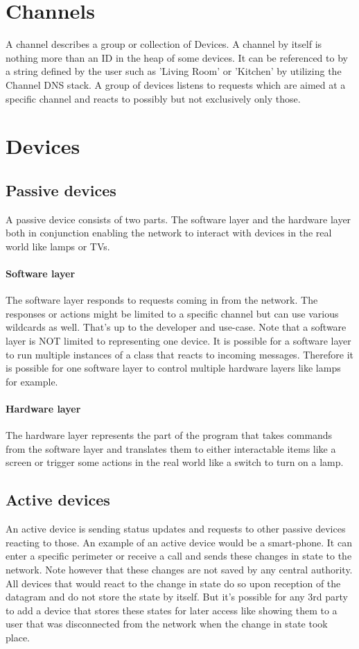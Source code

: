 \documentclass[a4paper]{article}
\begin{document}
	\section{Channels}
	    A channel describes a group or collection of Devices. A channel by itself is nothing more than an ID in the
	    heap of some devices. It can be referenced to by a string defined by the user such as 'Living Room' or 'Kitchen'
	    by utilizing the Channel DNS stack. A group of devices listens to requests which are aimed at a specific channel
	    and reacts to possibly but not exclusively only those.
	\section{Devices}
	    \subsection{Passive devices}
            A passive device consists of two parts. The software layer and the hardware layer both in conjunction
            enabling the network to interact with devices in the real world like lamps or TVs.
            \paragraph{Software layer} The software layer responds to requests coming in from the network. The responses or
                actions might be limited to a specific channel but can use various wildcards as well. That's up to the
                developer and use-case. Note that a software layer is NOT limited to representing one device. It is possible
                for a software layer to run multiple instances of a class that reacts to incoming messages. Therefore it is
                possible for one software layer to control multiple hardware layers like lamps for example.

            \paragraph{Hardware layer} The hardware layer represents the part of the program that takes commands from the
                software layer and translates them to either interactable items like a screen or trigger some actions in
                the real world like a switch to turn on a lamp.
        \subsection{Active devices}
            An active device is sending status updates and requests to other passive devices reacting to those. An
            example of an active device would be a smart-phone. It can enter a specific perimeter or receive a call and
            sends these changes in state to the network. Note however that these changes are not saved by any
            central authority. All devices that would react to the change in state do so upon reception of the datagram
            and do not store the state by itself. But it's possible for any 3rd party to add a device that stores these
            states for later access like showing them to a user that was disconnected from the network when the change
            in state took place.
\end{document}
